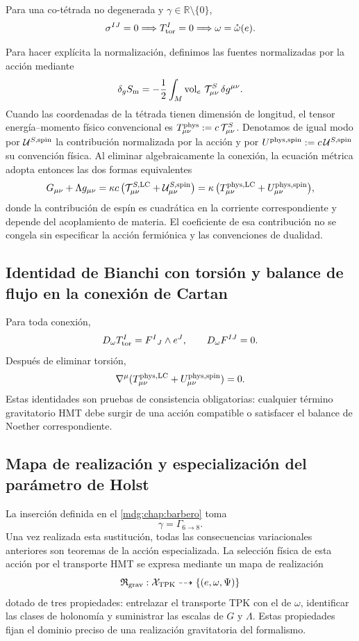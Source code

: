 \begin{corollary}
Para una co-tétrada no degenerada y
\(\gamma\in\mathbb R\setminus\{0\}\),
\[
 \sigma^{IJ}=0\Longrightarrow T_{\rm tor}^I=0
 \Longrightarrow\omega=\mathring\omega(e).
\]
\end{corollary}

Para hacer explícita la normalización, definimos las fuentes normalizadas por
la acción mediante
\[
 \delta_g S_{\rm m}
 =-\frac12\int_M\operatorname{vol}_e\,
 \mathcal T^{S}_{\mu\nu}\,\delta g^{\mu\nu}.
\]
Cuando las coordenadas de la tétrada tienen dimensión de longitud, el tensor
energía--momento físico convencional es
\(T^{\rm phys}_{\mu\nu}:=c\,\mathcal T^{S}_{\mu\nu}\). Denotamos de igual
modo por \(\mathcal U^{S,\rm spin}\) la contribución normalizada por la
acción y por \(U^{\rm phys,\rm spin}:=c\,\mathcal U^{S,\rm spin}\) su
convención física. Al eliminar algebraicamente la conexión, la ecuación
métrica adopta entonces las dos formas equivalentes
\[
 G_{\mu\nu}+\Lambda g_{\mu\nu}
 =\kappa c\,
 \bigl(\mathcal T_{\mu\nu}^{S,\rm LC}
       +\mathcal U_{\mu\nu}^{S,\rm spin}\bigr)
 =\kappa\,
 \bigl(T_{\mu\nu}^{\rm phys,LC}
       +U_{\mu\nu}^{\rm phys,spin}\bigr),
\]
donde la contribución de espín es cuadrática en la corriente correspondiente
y depende del acoplamiento de materia. El coeficiente de esa contribución no
se congela sin especificar la acción fermiónica y las convenciones de
dualidad.

\subsection{Identidad de Bianchi con torsión y balance de flujo en la conexión de Cartan}

Para toda conexión,
\[
 D_\omega T_{\rm tor}^I=F^I{}_J\wedge e^J,
 \qquad
 D_\omega F^{IJ}=0.
\]
Después de eliminar torsión,
\[
\nabla^\mu(T_{\mu\nu}^{\rm phys,LC}
          +U_{\mu\nu}^{\rm phys,spin})=0.
\]
Estas identidades son pruebas de consistencia obligatorias: cualquier término
gravitatorio HMT debe surgir de una acción compatible o satisfacer el balance
de Noether correspondiente.

\subsection{Mapa de realización y especialización del parámetro de Holst}

La inserción definida en el \cref{mdg:chap:barbero} toma
\[
 \gamma=\Gamma_{6\to8}.
\]
Una vez realizada esta sustitución, todas las consecuencias variacionales
anteriores son teoremas de la acción especializada. La selección física de
esta acción por el transporte HMT se expresa mediante un mapa de realización
\[
 \mathfrak R_{\rm grav}:\mathcal X_{\rm TPK}
 \dashrightarrow\{(e,\omega,\Psi)\}
\]
dotado de tres propiedades: entrelazar el transporte TPK con el de
\(\omega\), identificar las clases de holonomía y suministrar las escalas de
\(G\) y \(\Lambda\). Estas propiedades fijan el dominio preciso de una
realización gravitatoria del formalismo.

